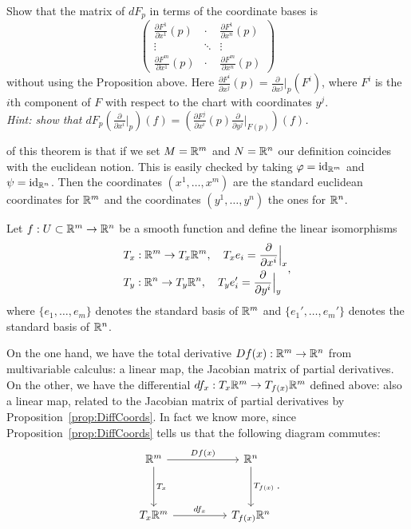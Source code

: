 \begin{exercise}
  Show that the matrix of $d F_p$ in terms of the coordinate bases is 
  \begin{equation}
    \begin{pmatrix}
      \frac{\partial F^1}{\partial x^1} (p) & \cdot & \frac{\partial F^1}{\partial x^n} (p) \\
      \vdots & \ddots & \vdots \\
      \frac{\partial F^m}{\partial x^1} (p) & \cdot & \frac{\partial F^m}{\partial x^n} (p)
    \end{pmatrix}
  \end{equation}
  without using the Proposition above. Here $\frac{\partial F^i}{\partial x^j} (p) = \frac{\partial}{\partial x^j}\big|_p (F^i)$, where $F^i$ is the $i$th component of $F$ with respect to the chart with coordinates $y^j$.\\
  \textit{\small Hint: show that $d F_p \left(\frac{\partial}{\partial x^i}\big|_p\right) (f) = \left(\frac{\partial F^j}{\partial x^i} (p) \frac{\partial}{\partial y^j}\big|_{F(p)}\right) (f)$.}
\end{exercise}

 of this theorem is that if we set $M=\mathbb{R}^m$ and $N=\mathbb{R}^n$ our definition coincides with the euclidean notion.
This is easily checked by taking $\varphi = \operatorname{id}_{\mathbb{R}^m}$ and $\psi=\operatorname{id}_{\mathbb{R}^n}$.
Then the coordinates $(x^1,\ldots,x^m)$ are the standard euclidean coordinates for $\mathbb{R}^m$ and the coordinates $(y^1,\ldots,y^n)$ the ones for $\mathbb{R}^n$.

Let $f:U\subset\mathbb{R}^m\to\mathbb{R}^n$ be a smooth function and define the linear isomorphisms
\begin{equation}\label{def:lin_iso_Tp}
  \begin{split}
  &T_x : \mathbb{R}^m \to T_x\mathbb{R}^m,\quad T_x e_i = \frac{\partial}{\partial x^i}\Big|_x\\
  &T_y : \mathbb{R}^n \to T_y\mathbb{R}^n,\quad T_y e_i' = \frac{\partial}{\partial y^i}\Big|_y
  \end{split},
\end{equation}
where $\{e_1,\ldots,e_m\}$ denotes the standard basis of $\mathbb{R}^m$ and $\{e_1',\ldots,e_m'\}$ denotes the standard basis of $\mathbb{R}^n$.

On the one hand, we have the total derivative $Df(x):\mathbb{R}^m\to\mathbb{R}^n$ from multivariable calculus: a linear map, the Jacobian matrix of partial derivatives.
On the other, we have the differential $df_x : T_x \mathbb{R}^m \to T_{f(x)}\mathbb{R}^m$ defined above: also a linear map, related to the Jacobian matrix of partial derivatives by Proposition~\ref{prop:DiffCoords}.
In fact we know more, since Proposition~\ref{prop:DiffCoords} tells us that the following diagram commutes:
\begin{equation}
  \begin{tikzcd}[row sep=huge, column sep=huge]
    \R^m \arrow[r, "Df(x)"] \arrow[d, "T_x"]
    & \R^n \arrow[d, "T_{f(x)}"] \\
    T_x\R^m \arrow[r, "df_x"]
    & T_{f(x)}\R^n
  \end{tikzcd}.
\end{equation}

